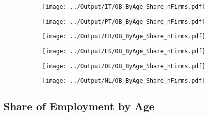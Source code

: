 \documentclass[12pt,notitlepage]{article}
\begin{document}
\begin{figure}[!htpb]
\centering
\begin{subfigure}{.49\textwidth}
    \centering
 \texttt{[image: ../Output/IT/OB\_ByAge\_Share\_nFirms.pdf]}
\end{subfigure}%
\begin{subfigure}{.49\textwidth}
    \centering
 \texttt{[image: ../Output/PT/OB\_ByAge\_Share\_nFirms.pdf]}
\end{subfigure}
\begin{subfigure}{.49\textwidth}
    \centering
 \texttt{[image: ../Output/FR/OB\_ByAge\_Share\_nFirms.pdf]}
\end{subfigure}%
\begin{subfigure}{.49\textwidth}
    \centering
 \texttt{[image: ../Output/ES/OB\_ByAge\_Share\_nFirms.pdf]}
\end{subfigure}
\begin{subfigure}{.49\textwidth}
    \centering
 \texttt{[image: ../Output/DE/OB\_ByAge\_Share\_nFirms.pdf]}
\end{subfigure}
\begin{subfigure}{.49\textwidth}
    \centering
 \texttt{[image: ../Output/NL/OB\_ByAge\_Share\_nFirms.pdf]}
\end{subfigure}
\end{figure}
\clearpage


\subsection{Share of Employment by Age}
\end{document}
